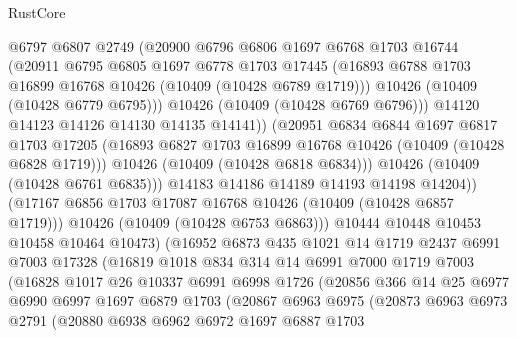 \begin{lexlean}{RustCore}
\begin{coremodule}
                    @6797
                    @6807
                    @2749
                    (@20900
                      @6796
                      @6806
                      @1697
                      @6768
                      @1703
                      @16744
                      (@20911
                        @6795
                        @6805
                        @1697
                        @6778
                        @1703
                        @17445
                        (@16893 @6788 @1703 @16899 @16768 @10426 (@10409 (@10428 @6789 @1719)))
                        @10426
                        (@10409 (@10428 @6779 @6795)))
                      @10426
                      (@10409 (@10428 @6769 @6796)))
                    @14120
                    @14123
                    @14126
                    @14130
                    @14135
                    @14141))
                (@20951
                  @6834
                  @6844
                  @1697
                  @6817
                  @1703
                  @17205
                  (@16893 @6827 @1703 @16899 @16768 @10426 (@10409 (@10428 @6828 @1719)))
                  @10426
                  (@10409 (@10428 @6818 @6834)))
                @10426
                (@10409 (@10428 @6761 @6835)))
              @14183
              @14186
              @14189
              @14193
              @14198
              @14204))
          (@17167 @6856 @1703 @17087 @16768 @10426 (@10409 (@10428 @6857 @1719)))
          @10426
          (@10409 (@10428 @6753 @6863)))
        @10444
        @10448
        @10453
        @10458
        @10464
        @10473)
      (@16952
        @6873
        @435
        @1021
        @14
        @1719
        @2437
        @6991
        @7003
        @17328
        (@16819
          @1018
          @834
          @314
          @14
          @6991
          @7000
          @1719
          @7003
          (@16828
            @1017
            @26
            @10337
            @6991
            @6998
            @1726
            (@20856
              @366
              @14
              @25
              @6977
              @6990
              @6997
              @1697
              @6879
              @1703
              (@20867
                @6963
                @6975
                (@20873
                  @6963
                  @6973
                  @2791
                  (@20880
                    @6938
                    @6962
                    @6972
                    @1697
                    @6887
                    @1703

\end{coremodule}
\end{lexlean}
